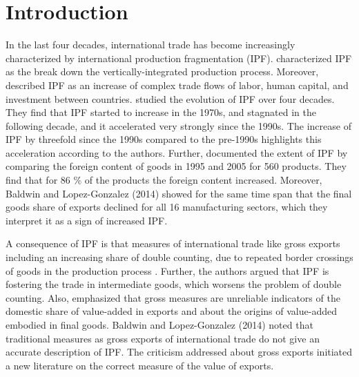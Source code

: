 \chapter{Introduction}
\label{cha:Intro} 
In the last four decades, international trade has become increasingly characterized by international production fragmentation (IPF). \textcite{feenstra98} characterized IPF as the break down the vertically-integrated production process.   Moreover, \textcite{baldwin2014}  described IPF as an increase of complex trade flows of labor, human capital, and investment between countries.  \textcite{Johnson2012}  studied the evolution of IPF over four decades. They find that IPF started to increase in the 1970s, and stagnated in the following decade, and it accelerated very strongly since the 1990s. The increase of IPF by threefold since the 1990s compared to the pre-1990s highlights this acceleration according to the authors.
Further,  \textcite{timmer_gvc} documented the extent of IPF  by comparing the foreign content of goods in 1995 and 2005  for 560 products. They find that for 86 \% of the products the foreign content increased. Moreover, Baldwin and Lopez-Gonzalez (2014) showed for the same time span that the final goods share of exports declined for all 16 manufacturing sectors, which they interpret it as a sign of increased IPF. 
\par %
A consequence of IPF is that measures of international trade like gross exports including an increasing share of double counting, due to repeated border crossings of goods in the production process \parencite{feenstra98}. Further, the authors argued that IPF is fostering the trade in intermediate goods, which worsens the problem of double counting.  Also, \textcite{johnson}  emphasized that gross measures are unreliable indicators of the domestic share of
value-added in exports and about the origins of value-added embodied in final goods.  Baldwin and Lopez-Gonzalez (2014)  noted that traditional measures as gross exports of international trade do not give an accurate description of IPF. The criticism addressed about gross exports initiated a new literature on the correct measure of the value of exports. \par 
